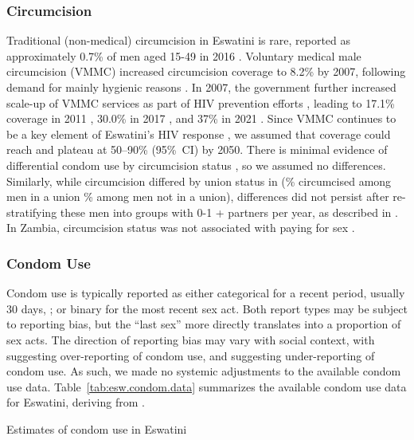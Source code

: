 \subsubsection{Circumcision}\label{mod.par.tm.circ}
Traditional (non-medical) circumcision in Eswatini is rare,
reported as approximately 0.7\% of men aged 15-49 in 2016 \cite{SHIMS2}.
Voluntary medical male circumcision (VMMC) increased circumcision coverage to 8.2\% by 2007,
following demand for mainly hygienic reasons \cite{SDHS2006}.
In 2007, the government further increased scale-up of VMMC services
as part of HIV prevention efforts \cite{SDHS2006}, leading to
17.1\% coverage in 2011 \cite{SHIMS1},
30.0\% in 2017 \cite{SHIMS2}, and
37\% in 2021 \cite{EswCOP21}.
Since VMMC continues to be a key element of Eswatini's HIV response \cite{EswCOP21},
we assumed that coverage could reach and plateau at 50--90\% (95\%~CI) by 2050.
There is minimal evidence of differential condom use by circumcision status \cite{SHIMS1},
so we assumed no differences.
Similarly, while circumcision differed by union status in \cite{SHIMS2}
(\% circumcised among men in a union \% among men not in a union),
differences did not persist after re-stratifying these men
into groups with 0-1 + partners per year, as described in .
In Zambia, circumcision status was not associated with paying for sex \cite{Carrasco2020}.
\subsubsection{Condom Use}\label{mod.par.tm.condom}
Condom use is typically reported as either
categorical for a recent period, usually 30 days,
\eg {}; or
binary for the most recent sex act.
Both report types may be subject to reporting bias,
but the ``last sex'' more directly translates into a proportion of sex acts.
The direction of reporting bias may vary with social context, with
\cite{Cordero-Coma2012} suggesting over-reporting of condom use, and
\cite{Behanzin2013} suggesting under-reporting of condom use.
As such, we made no systemic adjustments to the available condom use data.
Table~\ref{tab:esw.condom.data} summarizes the available condom use data for Eswatini,
deriving from \cite{SFHS1988,EswBSS2002,SDHS2006,Baral2014,EswKP2014,SHIMS2}.
\begin{table}
  \centering
  \caption{Estimates of condom use in Eswatini}
  \label{tab:esw.condom.data}
  
\end{table}

